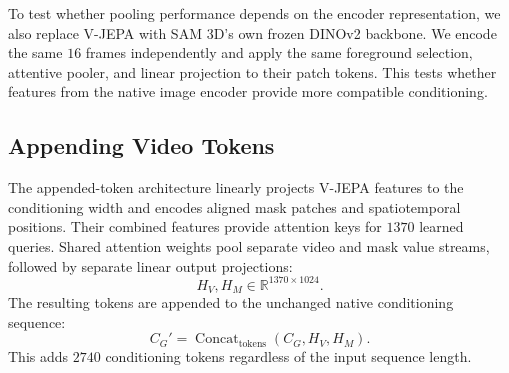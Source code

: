 \documentclass{article}
\begin{document}
To test whether pooling performance depends on the encoder representation, we also replace V-JEPA with SAM 3D's own frozen DINOv2 backbone. We encode the same $16$ frames independently and apply the same foreground selection, attentive pooler, and linear projection to their patch tokens. This tests whether features from the native image encoder provide more compatible conditioning.

\subsection{Appending Video Tokens}

The appended-token architecture linearly projects V-JEPA features to the conditioning width and encodes aligned mask patches and spatiotemporal positions. Their combined features provide attention keys for $1370$ learned queries. Shared attention weights pool separate video and mask value streams, followed by separate linear output projections:
\begin{equation}
    H_V,H_M\in\mathbb{R}^{1370\times1024}.
\end{equation}
The resulting tokens are appended to the unchanged native conditioning sequence:
\begin{equation}
    C_G'=\operatorname{Concat}_{\mathrm{tokens}}(C_G,H_V,H_M).
\end{equation}
This adds $2740$ conditioning tokens regardless of the input sequence length.

\end{document}

